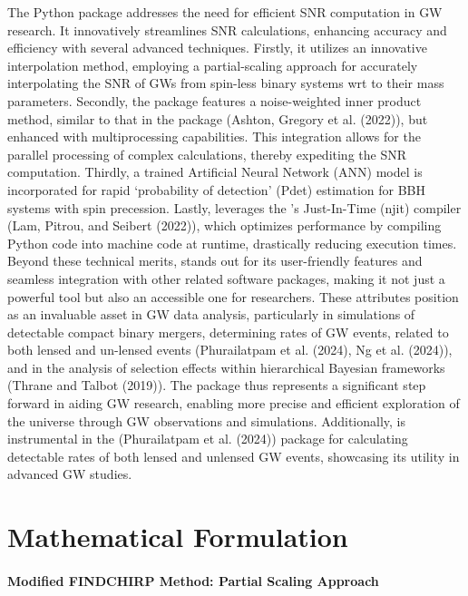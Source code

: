 \documentclass[10pt,a4paper,onecolumn]{article}
\let\textttOrig=\texttt
\def\texttt#1{\expandafter\textttOrig{\seqsplit{#1}}}
\let\oldparagraph\paragraph
\renewcommand{\paragraph}[1]{\oldparagraph{#1}\mbox{}}
\begin{document}
The \emph{\texttt{gwsnr}} Python package addresses the need for
efficient SNR computation in GW research. It innovatively streamlines
SNR calculations, enhancing accuracy and efficiency with several
advanced techniques. Firstly, it utilizes an innovative interpolation
method, employing a partial-scaling approach for accurately
interpolating the SNR of GWs from spin-less binary systems wrt to their
mass parameters. Secondly, the package features a noise-weighted inner
product method, similar to that in the \emph{\texttt{bilby}} package
(Ashton, Gregory et al. (2022)), but enhanced with multiprocessing
capabilities. This integration allows for the parallel processing of
complex calculations, thereby expediting the SNR computation. Thirdly, a
trained Artificial Neural Network (ANN) model is incorporated for rapid
`probability of detection' (Pdet) estimation for BBH systems with spin
precession. Lastly, \emph{\texttt{gwsnr}} leverages the
\emph{\texttt{numba}}'s Just-In-Time (njit) compiler (Lam, Pitrou, and
Seibert (2022)), which optimizes performance by compiling Python code
into machine code at runtime, drastically reducing execution times.
Beyond these technical merits, \emph{\texttt{gwsnr}} stands out for its
user-friendly features and seamless integration with other related
software packages, making it not just a powerful tool but also an
accessible one for researchers. These attributes position
\emph{\texttt{gwsnr}} as an invaluable asset in GW data analysis,
particularly in simulations of detectable compact binary mergers,
determining rates of GW events, related to both lensed and un-lensed
events (Phurailatpam et al. (2024), Ng et al. (2024)), and in the
analysis of selection effects within hierarchical Bayesian frameworks
(Thrane and Talbot (2019)). The package thus represents a significant
step forward in aiding GW research, enabling more precise and efficient
exploration of the universe through GW observations and simulations.
Additionally, \emph{\texttt{gwsnr}} is instrumental in the
\emph{\texttt{ler}} (Phurailatpam et al. (2024)) package for calculating
detectable rates of both lensed and unlensed GW events, showcasing its
utility in advanced GW studies.

\section{Mathematical Formulation}\label{mathematical-formulation}

\paragraph{Modified FINDCHIRP Method: Partial Scaling
Approach}\label{modified-findchirp-method-partial-scaling-approach}
\end{document}

